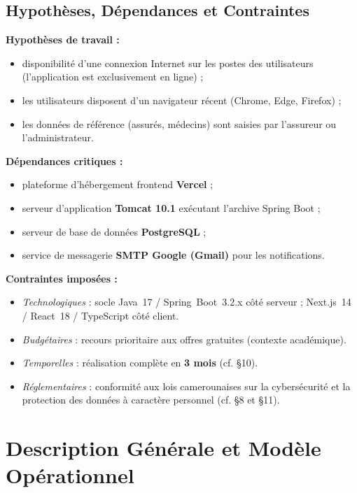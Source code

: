 \documentclass[11pt,a4paper]{article}
\begin{document}
\subsection{Hypothèses, Dépendances et Contraintes}

\textbf{Hypothèses de travail :}
\begin{itemize}[leftmargin=1.4em]
  \item disponibilité d'une connexion Internet sur les postes des utilisateurs
  (l'application est exclusivement en ligne) ;
  \item les utilisateurs disposent d'un navigateur récent (Chrome, Edge, Firefox) ;
  \item les données de référence (assurés, médecins) sont saisies par l'assureur ou
  l'administrateur.
\end{itemize}

\textbf{Dépendances critiques :}
\begin{itemize}[leftmargin=1.4em]
  \item plateforme d'hébergement frontend \textbf{Vercel} ;
  \item serveur d'application \textbf{Tomcat 10.1} exécutant l'archive Spring Boot ;
  \item serveur de base de données \textbf{PostgreSQL} ;
  \item service de messagerie \textbf{SMTP Google (Gmail)} pour les notifications.
\end{itemize}

\textbf{Contraintes imposées :}
\begin{itemize}[leftmargin=1.4em]
  \item \emph{Technologiques} : socle Java~17 / Spring~Boot~3.2.x côté serveur ;
  Next.js~14 / React~18 / TypeScript côté client.
  \item \emph{Budgétaires} : recours prioritaire aux offres gratuites (contexte académique).
  \item \emph{Temporelles} : réalisation complète en \textbf{3 mois} (cf. §10).
  \item \emph{Réglementaires} : conformité aux lois camerounaises sur la
  cybersécurité et la protection des données à caractère personnel (cf. §8 et §11).
\end{itemize}

\section{Description Générale et Modèle Opérationnel}
\end{document}
